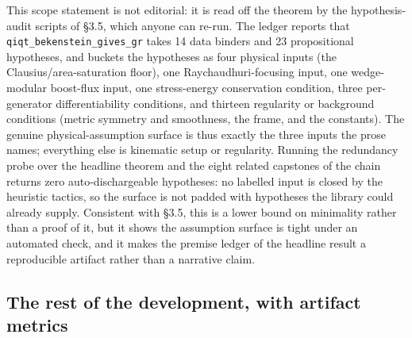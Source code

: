 \documentclass[11pt]{article}
\begin{document}
This scope statement is not editorial: it is read off the theorem by the hypothesis-audit scripts of
\S3.5, which anyone can re-run. The ledger reports that \texttt{qiqt\_bekenstein\_gives\_gr} takes 14
data binders and 23 propositional hypotheses, and buckets the hypotheses as four physical inputs (the
Clausius/area-saturation floor), one Raychaudhuri-focusing input, one wedge-modular boost-flux input,
one stress-energy conservation condition, three per-generator differentiability conditions, and
thirteen regularity or background conditions (metric symmetry and smoothness, the frame, and the
constants). The genuine physical-assumption surface is thus exactly the three inputs the prose names;
everything else is kinematic setup or regularity. Running the redundancy probe over the headline
theorem and the eight related capstones of the chain returns zero auto-dischargeable hypotheses: no
labelled input is closed by the heuristic tactics, so the surface is not padded with hypotheses the
library could already supply. Consistent with \S3.5, this is a lower bound on minimality rather than a
proof of it, but it shows the assumption surface is tight under an automated check, and it makes the
premise ledger of the headline result a reproducible artifact rather than a narrative claim.

\subsection{The rest of the development, with artifact metrics}
\end{document}
